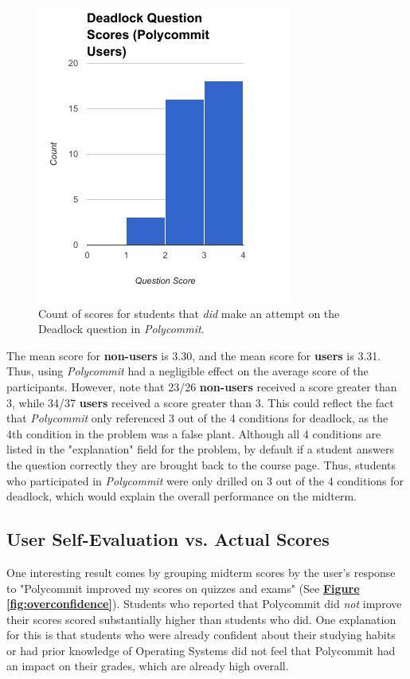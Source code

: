 \begin{figure}[h!b]
	\includegraphics[width=0.5\linewidth]{figures/deadlock-users}
	\caption{Count of scores for students that \textit{did} make an attempt on the Deadlock question in \textit{Polycommit}.}
	\label{fig:deadlock-yes}
\end{figure}

\par The mean score for \textbf{non-users} is 3.30, and the mean score for \textbf{users} is 3.31. Thus, using \textit{Polycommit} had a negligible effect on the average score of the participants. However, note that 23/26 \textbf{non-users} received a score greater than 3, while 34/37 \textbf{users} received a score greater than 3. This could reflect the fact that \textit{Polycommit} only referenced 3 out of the 4 conditions for deadlock, as the 4th condition in the problem was a false plant. Although all 4 conditions are listed in the "explanation" field for the problem, by default if a student answers the question correctly they are brought back to the course page. Thus, students who participated in \textit{Polycommit} were only drilled on 3 out of the 4 conditions for deadlock, which would explain the overall performance on the midterm.

\subsection{User Self-Evaluation vs. Actual Scores}

\par One interesting result comes by grouping midterm scores by the user's response to "Polycommit improved my scores on quizzes and exams" (See \textbf{\hyperref[fig:overconfidence]{Figure \ref*{fig:overconfidence}}}). Students who reported that Polycommit did \textit{not} improve their scores scored substantially higher than students who did. One explanation for this is that students who were already confident about their studying habits or had prior knowledge of Operating Systems did not feel that Polycommit had an impact on their grades, which are already high overall.

